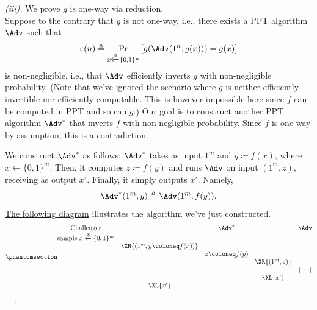 \begin{proof}[(iii)]
    We prove $g$ is one-way via reduction.\\
    Suppose to the contrary that $g$ is not one-way, i.e., there exists a PPT algorithm $\Adv$ such that
    \[
    \varepsilon(n)\triangleq \Pr_{x\xleftarrow{\$}\{0,1\}^n}\left[g(\Adv(1^n, g(x))) = g(x)\right]
    \]
    is non-negligible, i.e., that $\Adv$ efficiently inverts $g$ with non-negligible probability. (Note that we've ignored the scenario where $g$ is neither efficiently invertible nor efficiently computable. This is however impossible here since $f$ can be computed in PPT and so can $g$.) Our goal is to construct another PPT algorithm $\Adv^\ast$ that inverts $f$ with non-negligible probability. Since $f$ is one-way by assumption, this is a contradiction.

    We construct $\Adv^\ast$ as follows: $\Adv^\ast$ takes as input $1^{m}$ and $y\coloneq f(x)$, where $x\xleftarrow{}\{0,1\}^m$. Then, it computes $z\coloneq f(y)$ and runs $\Adv$ on input $(1^{m}, z)$, receiving as output $x'$. Finally, it simply outputs $x'$. Namely,
    \[
    \Adv^\ast(1^{m}, y) \triangleq \Adv(1^{m}, f(y)).
    \]
    \hyperref[diag:adv3]{The following diagram} illustrates the algorithm we've just constructed.
    \[\phantomsection\label{diag:adv3}
        \begin{array}{@{} c c c c c @{}}
        \textrm{Challenger} && \Adv^\ast & & \Adv \\
        \text{sample}\;x\xleftarrow{\$}\{0,1\}^m &&&&\\
        &\XR{(1^m, y\coloneq f(x))} &&&\\
        && z\coloneq f(y) &&\\
        &&&\XR{(1^{m}, z)} &\\
        &&&& [\cdots]\\
        &&&\XL{x'} &\\
        &\XL{x'} &&&
        \end{array}
    \]


\end{proof}
